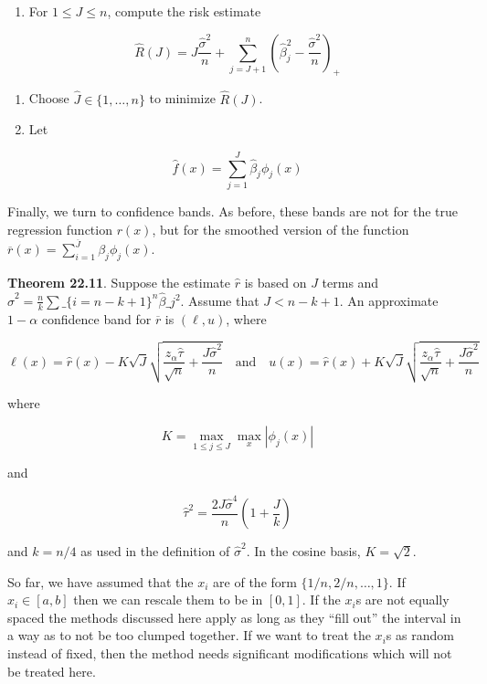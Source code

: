 \begin{enumerate}[tightlist,label={\arabic*.},resume]
\item
  For \(1 \leq J \leq n\), compute the risk estimate
\end{enumerate}

\[ \hat{R}(J) = J \frac{\hat{\sigma}^{2}}{n} + \sum_{j=J+1}^{n} \left(\hat{\beta}_{j}^{2} - \frac{\hat{\sigma}^{2}}{n} \right)_{+} \]

\begin{enumerate}
\def\labelenumi{\arabic{enumi}.}
\setcounter{enumi}{3}
\item
  Choose \(\hat{J} \in \{1, \dots, n \}\) to minimize \(\hat{R}(J)\).
\item
  Let
\end{enumerate}

\[ \hat{f}(x) = \sum_{j=1}^J \hat{\beta}_{j} \phi_{j}(x) \]

Finally, we turn to confidence bands. As before, these bands are not for
the true regression function \(r(x)\), but for the smoothed version of
the function
\(\overline{r}(x) = \sum_{i=1}^\overline{J} \beta_{j} \phi_{j}(x)\).

\textbf{Theorem 22.11}. Suppose the estimate \(\hat{r}\) is based on
\(J\) terms and $\hat{\sigma}^{2} = \frac{n}{k} \sum\_\{i=n-k+1\}^{n}
\hat{\beta}\_{j}^{2} $. Assume that \(J < n - k + 1\). An approximate
\(1 - \alpha\) confidence band for \(\overline{r}\) is \((\ell, u)\),
where

\[ \ell(x) = \hat{r}(x) - K \sqrt{J} \sqrt{\frac{z_{\alpha} \hat{\tau}}{\sqrt{n}} + \frac{J \hat{\sigma}^{2}}{n}}
\quad \text{and} \quad u(x) = \hat{r}(x) + K \sqrt{J} \sqrt{\frac{z_{\alpha} \hat{\tau}}{\sqrt{n}} + \frac{J \hat{\sigma}^{2}}{n}} \]

where

\[ K = \max_{1 \leq j \leq J} \max_x | \phi_{j}(x) | \]

and

\[ \hat{\tau}^{2} = \frac{2 J \hat{\sigma}^{4}}{n} \left( 1 + \frac{J}{k} \right) \]

and \(k = n / 4\) as used in the definition of \(\hat{\sigma}^{2}\). In
the cosine basis, \(K = \sqrt{2}\).

So far, we have assumed that the \(x_{i}\) are of the form
\(\{1/n, 2/n, \dots, 1\}\). If \(x_{i} \in [a, b]\) then we can rescale
them to be in \([0, 1]\). If the \(x_{i}\)s are not equally spaced the
methods discussed here apply as long as they ``fill out'' the interval
in a way as to not be too clumped together. If we want to treat the
\(x_{i}\)s as random instead of fixed, then the method needs significant
modifications which will not be treated here.

